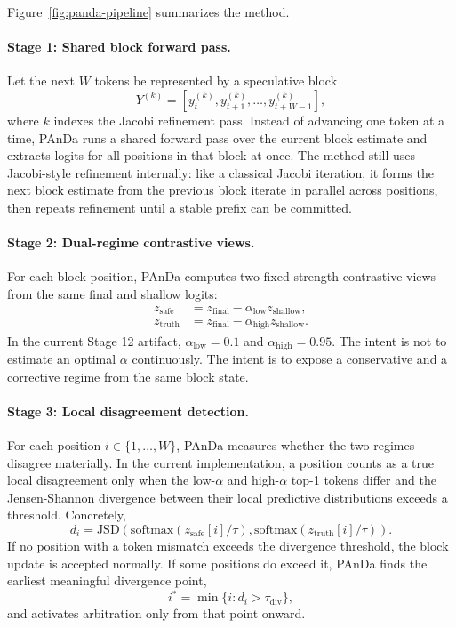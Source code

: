 \documentclass[10pt,twocolumn]{article}
\begin{document}
Figure~\ref{fig:panda-pipeline} summarizes the method.

\paragraph{Stage 1: Shared block forward pass.}
Let the next \(W\) tokens be represented by a speculative block
\begin{equation}
Y^{(k)} = [y_t^{(k)}, y_{t+1}^{(k)}, \ldots, y_{t+W-1}^{(k)}],
\end{equation}
where \(k\) indexes the Jacobi refinement pass. Instead of advancing one token at a time, PAnDa runs a shared forward pass over the current block estimate and extracts logits for all positions in that block at once. The method still uses Jacobi-style refinement internally: like a classical Jacobi iteration, it forms the next block estimate from the previous block iterate in parallel across positions, then repeats refinement until a stable prefix can be committed.

\paragraph{Stage 2: Dual-regime contrastive views.}
For each block position, PAnDa computes two fixed-strength contrastive views from the same final and shallow logits:
\begin{equation}
\begin{aligned}
z_{\text{safe}} &= z_{\text{final}} - \alpha_{\text{low}} z_{\text{shallow}}, \\
z_{\text{truth}} &= z_{\text{final}} - \alpha_{\text{high}} z_{\text{shallow}}.
\end{aligned}
\end{equation}
In the current Stage 12 artifact, \(\alpha_{\text{low}}=0.1\) and \(\alpha_{\text{high}}=0.95\). The intent is not to estimate an optimal \(\alpha\) continuously. The intent is to expose a conservative and a corrective regime from the same block state.

\paragraph{Stage 3: Local disagreement detection.}
For each position \(i \in \{1,\ldots,W\}\), PAnDa measures whether the two regimes disagree materially. In the current implementation, a position counts as a true local disagreement only when the low-\(\alpha\) and high-\(\alpha\) top-1 tokens differ and the Jensen-Shannon divergence between their local predictive distributions exceeds a threshold. Concretely,
\begin{equation}
d_i = \mathrm{JSD}\!\left(
\mathrm{softmax}\!\left(z_{\text{safe}}[i] / \tau\right),
\mathrm{softmax}\!\left(z_{\text{truth}}[i] / \tau\right)
\right).
\end{equation}
If no position with a token mismatch exceeds the divergence threshold, the block update is accepted normally. If some positions do exceed it, PAnDa finds the earliest meaningful divergence point,
\begin{equation}
i^{*} = \min \{ i : d_i > \tau_{\text{div}} \},
\end{equation}
and activates arbitration only from that point onward.
\end{document}
